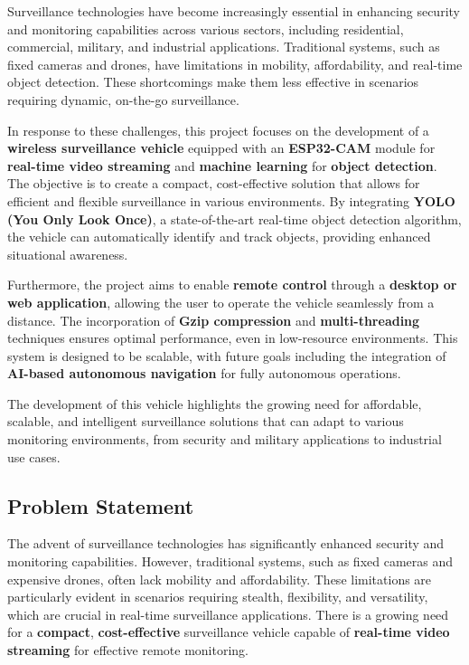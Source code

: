 \documentclass[12pt,a4paper]{report}
\begin{document}
Surveillance technologies have become increasingly essential in enhancing security and monitoring capabilities across various sectors, including residential, commercial, military, and industrial applications. Traditional systems, such as fixed cameras and drones, have limitations in mobility, affordability, and real-time object detection. These shortcomings make them less effective in scenarios requiring dynamic, on-the-go surveillance.

In response to these challenges, this project focuses on the development of a \textbf{wireless surveillance vehicle} equipped with an \textbf{ESP32-CAM} module for \textbf{real-time video streaming} and \textbf{machine learning} for \textbf{object detection}. The objective is to create a compact, cost-effective solution that allows for efficient and flexible surveillance in various environments. By integrating \textbf{YOLO (You Only Look Once)}, a state-of-the-art real-time object detection algorithm, the vehicle can automatically identify and track objects, providing enhanced situational awareness.

Furthermore, the project aims to enable \textbf{remote control} through a \textbf{desktop or web application}, allowing the user to operate the vehicle seamlessly from a distance. The incorporation of \textbf{Gzip compression} and \textbf{multi-threading} techniques ensures optimal performance, even in low-resource environments. This system is designed to be scalable, with future goals including the integration of \textbf{AI-based autonomous navigation} for fully autonomous operations.

The development of this vehicle highlights the growing need for affordable, scalable, and intelligent surveillance solutions that can adapt to various monitoring environments, from security and military applications to industrial use cases.

	\label{Problem Statement}
	\subsection{Problem Statement }
The advent of surveillance technologies has significantly enhanced security and monitoring capabilities. However, traditional systems, such as fixed cameras and expensive drones, often lack mobility and affordability. These limitations are particularly evident in scenarios requiring stealth, flexibility, and versatility, which are crucial in real-time surveillance applications. There is a growing need for a \textbf{compact}, \textbf{cost-effective} surveillance vehicle capable of \textbf{real-time video streaming} for effective remote monitoring.
\end{document}
